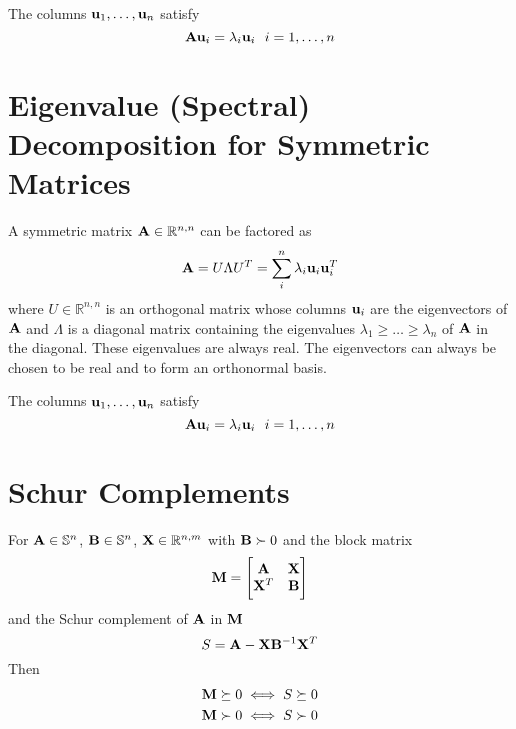 The columns $\mathbf{u}_1,\ldots,\mathbf{u}_n$ satisfy
\begin{equation}
\mathbf{A} \mathbf{u}_i=\lambda_i \mathbf{u}_i~~i=1,\ldots,n
\end{equation}

\section{Eigenvalue (Spectral) Decomposition for Symmetric Matrices}

A symmetric matrix $\mathbf{A}\in\mathbb{R}^{n,n}$ can be factored as
\begin{equation}
\mathbf{A}=U\Lambda U^T=\sum_i^n \lambda_i \mathbf{u}_i \mathbf{u}_i^T
\end{equation}
where $U\in\mathbb{R}^{n,n}$ is an orthogonal matrix whose columns $\mathbf{u}_i$ are the eigenvectors of $\mathbf{A}$ and $\Lambda$ is a diagonal matrix containing the eigenvalues $\lambda_1\ge\ldots\ge\lambda_n$ of $\mathbf{A}$ in the diagonal. These eigenvalues are always real. The eigenvectors can always be chosen to be real and to form an orthonormal basis.

The columns $\mathbf{u}_1,\ldots,\mathbf{u}_n$ satisfy
\begin{equation}
\mathbf{A} \mathbf{u}_i=\lambda_i \mathbf{u}_i~~i=1,\ldots,n
\end{equation}


\section{Schur Complements}

For $\mathbf{A}\in\mathbb{S}^{n}$, $\mathbf{B}\in\mathbb{S}^{n}$, $\mathbf{X}\in\mathbb{R}^{n,m}$ with $\mathbf{B}\succ0$ and the block matrix
\begin{equation}
\mathbf{M}=
\begin{bmatrix}
\mathbf{A} & \mathbf{X} \\
\mathbf{X}^T & \mathbf{B}
\end{bmatrix}
\end{equation}
and the Schur complement of $\mathbf{A}$ in $\mathbf{M}$
\begin{equation}
S=\mathbf{A}-\mathbf{X}\mathbf{B}^{-1}\mathbf{X}^T
\end{equation}
Then
\begin{align}
\mathbf{M}\succeq0&\iff S\succeq0 \\
\mathbf{M}\succ0 &\iff S\succ0 
\end{align}

